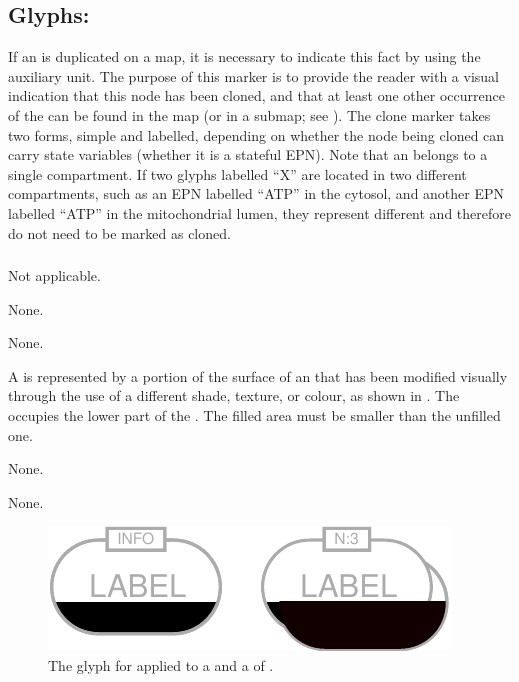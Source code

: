 \subsection{Glyphs: }
\label{sec:cloneMarker}

If an  is duplicated on a map, it is necessary to indicate this fact by using the  auxiliary unit.
The purpose of this marker is to provide the reader with a visual indication that this node has been cloned, and that at least one other occurrence of the  can be found in the map (or in a submap; see ).
The clone marker takes two forms, simple and labelled, depending on whether the node being cloned can carry state variables (\ie whether it is a stateful EPN).
Note that an  belongs to a single compartment.
If two glyphs labelled ``X'' are located in two different compartments, such as an EPN labelled ``ATP'' in the cytosol, and another EPN labelled ``ATP'' in the mitochondrial lumen, they represent different  and therefore do not need to be marked as cloned.

\subsubsection{}

\begin{glyphDescription}

\glyphSboTerm
Not applicable.


\glyphIncoming
None.



\glyphOutgoing
None.


\glyphContainer
A  is represented by a portion of the surface of an  that has been modified visually through the use of a different shade, texture, or colour, as shown in .
The  occupies the lower part of the .
The filled area must be smaller than the unfilled one.

\glyphLabel
None.

\glyphAux
None.

\end{glyphDescription}

\begin{figure}[H]
  \centering
  \includegraphics{images/build/simple_clone_marker.pdf}
  \caption{The \PD glyph for  applied to a  and a  of .}
  \label{fig:simpleCloneMarker}
\end{figure}

